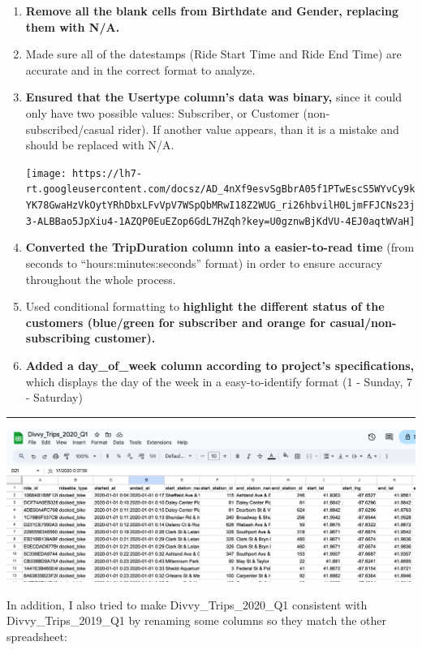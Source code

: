 \documentclass[
]{article}
\begin{document}
\begin{enumerate}
\def\labelenumi{\arabic{enumi}.}
\item
  \textbf{Remove all the blank cells from Birthdate and Gender,
  replacing them with N/A.}
\item
  Made sure all of the datestamps (Ride Start Time and Ride End Time)
  are accurate and in the correct format to analyze.
\item
  \textbf{Ensured that the Usertype column's data was binary,} since it
  could only have two possible values: Subscriber, or Customer
  (non-subscribed/casual rider). If another value appears, than it is a
  mistake and should be replaced with N/A.

  \texttt{[image: https://lh7-rt.googleusercontent.com/docsz/AD\_4nXf9esvSgBbrA05f1PTwEscS5WYvCy9kYK78GwaHzVkOytYRhDbxLFvVpV7WSpQbMRwI18Z2WUG\_ri26hbvilH0LjmFFJCNs23j3-ALBBao5JpXiu4-1AZQP0EuEZop6GdL7HZqh?key=U0gznwBjKdVU-4EJ0aqtWVaH]}
\item
  \textbf{Converted the TripDuration column into a easier-to-read time}
  (from seconds to ``hours:minutes:seconds'' format) in order to ensure
  accuracy throughout the whole process.
\item
  Used conditional formatting to \textbf{highlight the different status
  of the customers (blue/green for subscriber and orange for
  casual/non-subscribing customer).}
\item
  \textbf{Added a day\_of\_week column according to project's
  specifications,} which displays the day of the week in a
  easy-to-identify format (1 - Sunday, 7 - Saturday)
\end{enumerate}

\begin{center}\rule{0.5\linewidth}{0.5pt}\end{center}

\includegraphics{images/Divvy_Trips_2020 Picture.png}

In addition, I also tried to make Divvy\_Trips\_2020\_Q1 consistent with
Divvy\_Trips\_2019\_Q1 by renaming some columns so they match the other
spreadsheet:
\end{document}
